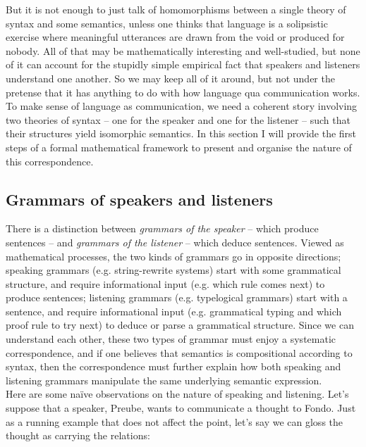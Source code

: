 \begin{fullwidth}
But it is not enough to just talk of homomorphisms between a single theory of syntax and some semantics, unless one thinks that language is a solipsistic exercise where meaningful utterances are drawn from the void or produced for nobody. All of that may be mathematically interesting and well-studied, but none of it can account for the stupidly simple empirical fact that speakers and listeners understand one another. So we may keep all of it around, but not under the pretense that it has anything to do with how language qua communication works.\\

To make sense of language as communication, we need a coherent story involving two theories of syntax -- one for the speaker and one for the listener -- such that their structures yield isomorphic semantics. In this section I will provide the first steps of a formal mathematical framework to present and organise the nature of this correspondence.

\subsection{Grammars of speakers and listeners}

There is a distinction between \emph{grammars of the speaker} -- which produce sentences -- and \emph{grammars of the listener} -- which deduce sentences. Viewed as mathematical processes, the two kinds of grammars go in opposite directions; speaking grammars (e.g. string-rewrite systems) start with some grammatical structure, and require informational input (e.g. which rule comes next) to produce sentences; listening grammars (e.g. typelogical grammars) start with a sentence, and require informational input (e.g. grammatical typing and which proof rule to try next) to deduce or parse a grammatical structure. Since we can understand each other, these two types of grammar must enjoy a systematic correspondence, and if one believes that semantics is compositional according to syntax, then the correspondence must further explain how both speaking and listening grammars manipulate the same underlying semantic expression.\\

Here are some na\"{i}ve observations on the nature of speaking and listening. Let's suppose that a speaker, Preube, wants to communicate a thought to Fondo. Just as a running example that does not affect the point, let's say we can gloss the thought as carrying the relations:\\


\end{fullwidth}
